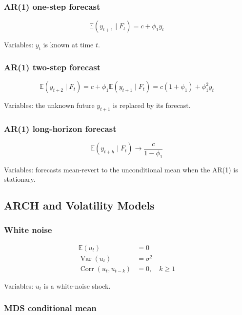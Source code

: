 \documentclass[
  8pt,
  twocolumn]{extarticle}
\begin{document}
\subsubsection{AR(1) one-step forecast}\label{ar1-one-step-forecast}

\[
\mathbb E(y_{t+1}\mid F_t)=c+\phi_1y_t
\]

Variables: \(y_t\) is known at time \(t\).

\subsubsection{AR(1) two-step forecast}\label{ar1-two-step-forecast}

\[
\mathbb E(y_{t+2}\mid F_t)=c+\phi_1\mathbb E(y_{t+1}\mid F_t)=c(1+\phi_1)+\phi_1^2y_t
\]

Variables: the unknown future \(y_{t+1}\) is replaced by its forecast.

\subsubsection{AR(1) long-horizon
forecast}\label{ar1-long-horizon-forecast}

\[
\mathbb E(y_{t+h}\mid F_t)\to \frac{c}{1-\phi_1}
\]

Variables: forecasts mean-revert to the unconditional mean when the
AR(1) is stationary.

\subsection{ARCH and Volatility
Models}\label{arch-and-volatility-models}

\subsubsection{White noise}\label{white-noise}

\[
\begin{aligned}
\mathbb E(u_t)&=0\\
\operatorname{Var}(u_t)&=\sigma^2\\
\operatorname{Corr}(u_t,u_{t-k})&=0,\quad k\ge1
\end{aligned}
\]

Variables: \(u_t\) is a white-noise shock.

\subsubsection{MDS conditional mean}\label{mds-conditional-mean}
\end{document}
